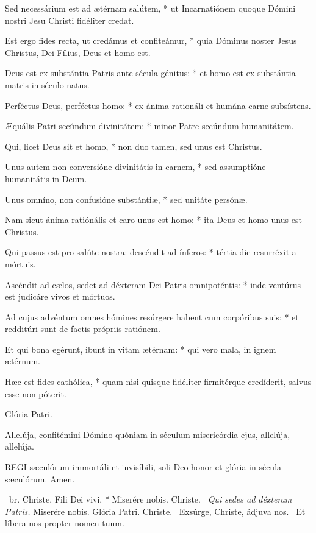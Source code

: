 Sed necessárium est ad ætérnam salútem, * ut Incarnatiónem quoque Dómini nostri Jesu Christi fidéliter credat.

Est ergo fides recta, ut credámus et confiteámur, * quia Dóminus noster Jesus Christus, Dei Fílius, Deus et homo est.

Deus est ex substántia Patris ante sécula génitus: * et homo est ex substántia matris in século natus.

Perféctus Deus, perféctus homo: * ex ánima rationáli et humána carne subsístens.

Æquális Patri secúndum divinitátem: * minor Patre secúndum humanitátem.

Qui, licet Deus sit et homo, * non duo tamen, sed unus est Christus.

Unus autem non conversióne divinitátis in carnem, * sed assumptióne humanitátis in Deum.

Unus omníno, non confusióne substántiæ, * sed unitáte persónæ.

Nam sicut ánima ratiónális et caro unus est homo: * ita Deus et homo unus est Christus.

Qui passus est pro salúte nostra: descéndit ad ínferos: * tértia die resurréxit a mórtuis.

Ascéndit ad cælos, sedet ad déxteram Dei Patris omnipoténtis: * inde ventúrus est judicáre vivos et mórtuos.

Ad cujus advéntum omnes hómines resúrgere habent cum corpóribus suis: * et redditúri sunt de factis própriis ratiónem.

Et qui bona egérunt, ibunt in vitam ætérnam: * qui vero mala, in ignem ætérnum.

Hæc est fides cathólica, * quam nisi quisque fidéliter firmitérque credíderit, salvus esse non póterit.

Glória Patri.


  Allelúja, confitémini Dómino quóniam in séculum misericórdia ejus, allelúja, allelúja.


\lettrine[lines=2]{R}{EGI} sæculórum immortáli et invisíbili, soli Deo honor et glória in sécula sæculórum. Amen.

\R\ br. Christe, Fili Dei vivi, * Miserére nobis. Christe. \V\ \textit{Qui sedes ad déxteram Patris.} Miserére nobis. Glória Patri. Christe. \V\ Exsúrge, Christe, ádjuva nos. \R\ Et líbera nos propter nomen tuum.

